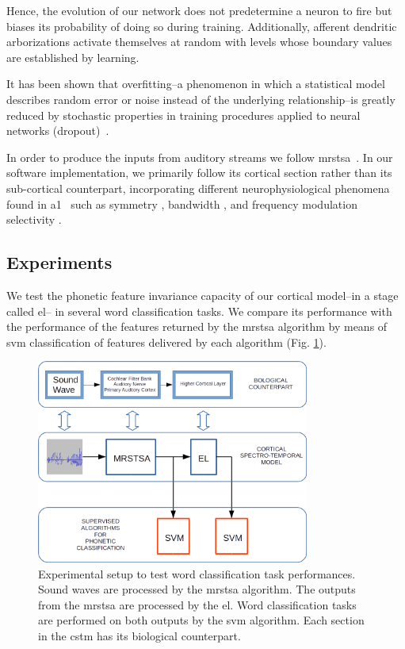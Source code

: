 \documentclass[11pt,a4paper]{article}
\begin{document}
Hence, the evolution of our network does not predetermine a neuron to fire but biases its probability of doing so during training. Additionally, afferent dendritic arborizations activate themselves at random with levels whose boundary values are established by learning. 

It has been shown that overfitting--a phenomenon in which a statistical model describes random error or noise instead of the underlying relationship--is greatly reduced by stochastic properties in training procedures applied to neural networks (dropout)~\cite{JMLR:v15:srivastava14a}.

In order to produce the inputs from auditory streams we follow  \gls{mrstsa}~\cite{chi_2005}. In our software implementation, we primarily follow its cortical section rather than its sub-cortical counterpart, incorporating different neurophysiological phenomena found in \gls{a1}~\cite{wang_1995} such as symmetry \cite{shamma_1993}, bandwidth \cite{schreiner_1990}, and frequency modulation selectivity \cite{shamma_1993,heil_1992,mendelson_1985}.

\subsection*{Experiments}

We test the phonetic feature invariance capacity of our cortical model--in a stage called \gls{el}-- 
in several word classification tasks. We compare its performance with the performance of the features returned by the \gls{mrstsa} algorithm by means of \gls{svm} classification of features delivered by each algorithm (Fig. \ref{fig:Experiment}).

\begin{figure}[h!]
    \centering
    \includegraphics[width=0.8\textwidth]{Experiment.png}
    \caption{Experimental setup to test word classification task performances.
    Sound waves are processed by the \gls{mrstsa} algorithm.
    The outputs from the \gls{mrstsa} are processed by the \gls{el}.
    Word classification tasks are performed on both outputs by the \gls{svm} algorithm.
    Each section in the \gls{cstm} has its biological counterpart.}
    \label{fig:Experiment}
\end{figure}
\end{document}
